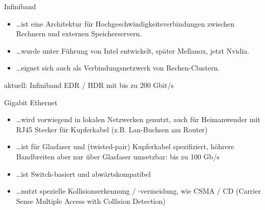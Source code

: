 \begin{defi}{Infiniband}
    \begin{itemize}
        \item \ldots ist eine Architektur für Hochgeschwindigkeitsverbindungen zwischen Rechnern und externen Speicherservern.
        \item \ldots wurde unter Führung von Intel entwickelt, später Mellanox, jetzt Nvidia.
        \item \ldots eignet sich auch als Verbindungsnetzwerk von Rechen-Clustern.
    \end{itemize}
    aktuell: Infiniband EDR / HDR mit bis zu 200 Gbit/s
\end{defi}

\begin{defi}{Gigabit Ethernet}
    \begin{itemize}
        \item \ldots wird vorwiegend in lokalen Netzwerken genutzt,
              auch für Heimanwender mit RJ45 Stecker für Kupferkabel (z.B. Lan-Buchsen am Router)
        \item \ldots ist für Glasfaser und (twisted-pair) Kupferkabel spezifiziert,
              höhrere Bandbreiten aber nur über Glasfaser umsetzbar: bis zu 100 Gb/s
        \item \ldots ist Switch-basiert und abwärtskompatibel
        \item \ldots nutzt spezielle Kollisionserkennung / -vermeidung,
              wie CSMA / CD (Carrier Sense Multiple Access with Collision Detection)
    \end{itemize}
\end{defi}

